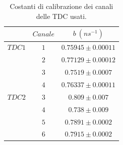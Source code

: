 \documentclass{standalone}
\begin{document}
\begin{table}[H]                        %
	\begin{center}                          %
		\begin{tabular}{r|c|c}                  %
			\hline \hline                           %
			 & $Canale$ & $b\ (ns^{-1})$\\           %
			\hline                                  %
			$TDC1$ & $1$ & $0.75945 \pm 0.00011$\\           %
			\hline                                  %
			& $2$ & $0.77129 \pm 0.00012$\\           %
			\hline
			 & $3$ & $0.7519 \pm 0.0007$\\           %
			\hline
			 & $4$ & $0.76337 \pm 0.00011$\\           %
			\hline  \hline
			$TDC2$ & $3$ & $0.809 \pm 0.007$\\           %
			\hline
			 & $4$ & $0.738 \pm 0.009$\\           %
			\hline
			 & $5$ & $0.7891 \pm 0.0002$\\           %
			\hline
			 & $6$ & $0.7915 \pm 0.0002$\\           %

			\hline \hline                           %
		\end{tabular}
    \caption[legenda elenco tabelle]{Costanti di calibrazione dei canali delle TDC usati.}\label{tab:calibrazione}
	\end{center}
\end{table}
\end{document}
